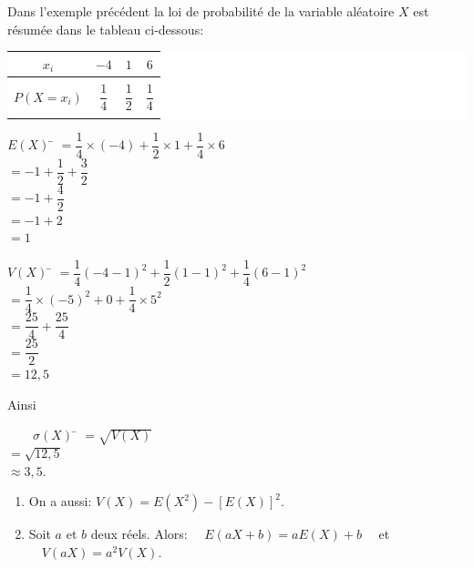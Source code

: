 \documentclass[a4paper,11pt,cours]{nsi} %
\begin{document}
\begin{exemple}[]
	Dans l'exemple précédent la loi de probabilité de la variable aléatoire $X$ est résumée dans le tableau ci-dessous:
	\begin{center}
		\colorbox{white}{
			\begin{tabular}{|c|c|c|c|}
				\hline
				{\boldmath $x_i$} & $-4$ & $1$ & $6$ \\
				\hline
				& & & \\
				{\boldmath $P(X=x_i)$} & $\dfrac{1}{4}$ & $\dfrac{1}{2}$ & $\dfrac{1}{4}$\\
				& & & \\
				\hline
		\end{tabular}}
	\end{center}
	\begin{multicols}{2}
		\begin{tabbing}
			$E(X)$	\=	$=\dfrac{1}{4}\times(-4)+\dfrac{1}{2}\times1+\dfrac{1}{4}\times 6$\\[0.5em]
			\>	$=-1+\dfrac{1}{2}+\dfrac{3}{2}$\\[0.5em]
			\>	$=-1+\dfrac{4}{2}$\\[0.5em]
			\>	$=-1+2$\\[0.5em]
			\>	$=1$
		\end{tabbing}
		\columnbreak
		\begin{tabbing}
			$V(X)$	\=	$=\dfrac{1}{4}(-4-1)^2+\dfrac{1}{2}(1-1)^2+\dfrac{1}{4}(6-1)^2$\\[0.5em]
			\>	$=\dfrac{1}{4}\times(-5)^2+0+\dfrac{1}{4}\times5^2$\\[0.5em]
			\>	$=\dfrac{25}{4}+\dfrac{25}{4}$\\[0.5em]
			\>	$=\dfrac{25}{2}$\\[0.5em]
			\>	$=12,5$
		\end{tabbing}
	\end{multicols}
	Ainsi
	\begin{tabbing}
		$\qquad\sigma(X)$	\=	$=\sqrt{V(X)}$\\[0.5em]
		\>	$=\sqrt{12,5}$\\[0.5em]
		\>	$ \approx 3,5$.
	\end{tabbing}
\end{exemple}

\begin{propriete}[]
	\begin{enumerate}[label=\textbullet]
		\item 	On a aussi: {\boldmath $V(X)=E(X^2)-[E(X)]^2$}.
		\item 	Soit $a$ et $b$ deux réels. Alors: {\boldmath $\quad E(aX+b)=aE(X)+b\quad$ et 							$\quad V(aX)=a^2 V(X)$}.
	\end{enumerate}
\end{propriete}
\end{document}
